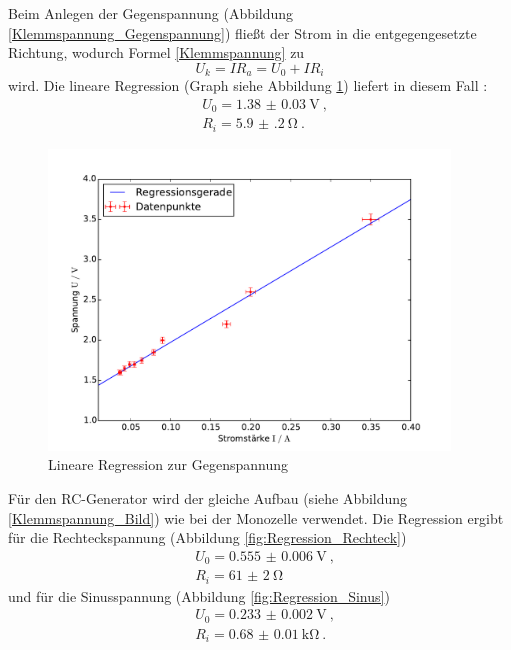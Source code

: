 Beim Anlegen der Gegenspannung (Abbildung \ref{Klemmspannung_Gegenspannung}) fließt der Strom in die entgegengesetzte Richtung, wodurch Formel \eqref{Klemmspannung} zu
\begin{equation}
U_k = IR_a = U_0+IR_i
\end{equation}
wird. Die lineare Regression (Graph siehe Abbildung \ref{fig:Regression_Gegenspannung}) liefert in diesem Fall :
\begin{align}
&U_0 = \SI{1.38(3)}{\volt} \ , \\
&R_i = \SI{5.9(2)}{\ohm}  \ .
\end{align}
\begin{figure}[h!]
	\centering
	\includegraphics[width=0.95\textwidth]{Spannung_Messung_c.pdf}
	\caption{Lineare Regression zur Gegenspannung}
	\label{fig:Regression_Gegenspannung}
\end{figure}


Für den RC-Generator wird der gleiche Aufbau (siehe Abbildung \ref{Klemmspannung_Bild}) wie bei der Monozelle verwendet. Die Regression ergibt für die Rechteckspannung (Abbildung \ref{fig:Regression_Rechteck})
\begin{align}
&U_0 = \SI{0.555(6)}{\volt} \ , \\
&R_i = \SI{61(2)}{\ohm} 
\end{align}
und für die Sinusspannung (Abbildung \ref{fig:Regression_Sinus})
\begin{align}
&U_0 = \SI{0.233(2)}{\volt} \ , \\
&R_i = \SI{0.68(1)}{\kilo\ohm} \ .
\end{align}








